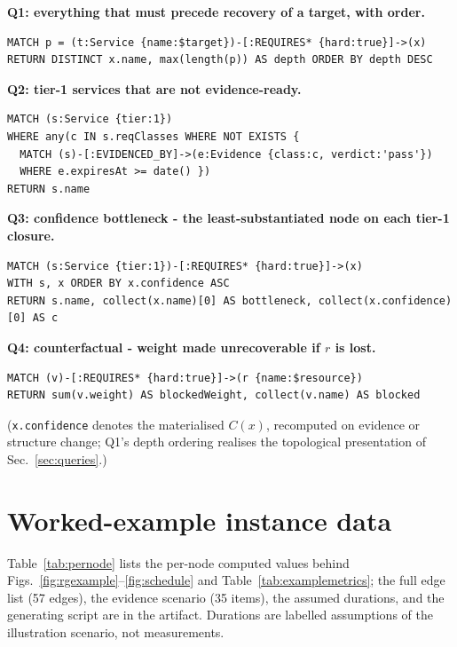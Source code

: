 \noindent\textbf{Q1: everything that must precede recovery of a target, with order.}
\begin{lstlisting}[language=Cypher]
MATCH p = (t:Service {name:$target})-[:REQUIRES* {hard:true}]->(x)
RETURN DISTINCT x.name, max(length(p)) AS depth ORDER BY depth DESC
\end{lstlisting}
\noindent\textbf{Q2: tier-1 services that are not evidence-ready.}
\begin{lstlisting}[language=Cypher]
MATCH (s:Service {tier:1})
WHERE any(c IN s.reqClasses WHERE NOT EXISTS {
  MATCH (s)-[:EVIDENCED_BY]->(e:Evidence {class:c, verdict:'pass'})
  WHERE e.expiresAt >= date() })
RETURN s.name
\end{lstlisting}
\noindent\textbf{Q3: confidence bottleneck - the least-substantiated node on each tier-1 closure.}
\begin{lstlisting}[language=Cypher]
MATCH (s:Service {tier:1})-[:REQUIRES* {hard:true}]->(x)
WITH s, x ORDER BY x.confidence ASC
RETURN s.name, collect(x.name)[0] AS bottleneck, collect(x.confidence)[0] AS c
\end{lstlisting}
\begin{minipage}{\columnwidth}
\noindent\textbf{Q4: counterfactual - weight made unrecoverable if $r$ is lost.}
\begin{lstlisting}[language=Cypher]
MATCH (v)-[:REQUIRES* {hard:true}]->(r {name:$resource})
RETURN sum(v.weight) AS blockedWeight, collect(v.name) AS blocked
\end{lstlisting}
\end{minipage}

\noindent (\texttt{x.confidence} denotes the materialised $C(x)$, recomputed on evidence or structure change; Q1's depth ordering realises the topological presentation of Sec.~\ref{sec:queries}.)

\section{Worked-example instance data}
\label{app:instance}

Table~\ref{tab:pernode} lists the per-node computed values behind Figs.~\ref{fig:rgexample}--\ref{fig:schedule} and Table~\ref{tab:examplemetrics}; the full edge list (57 edges), the evidence scenario (35 items), the assumed durations, and the generating script are in the artifact. Durations are labelled assumptions of the illustration scenario, not measurements.


